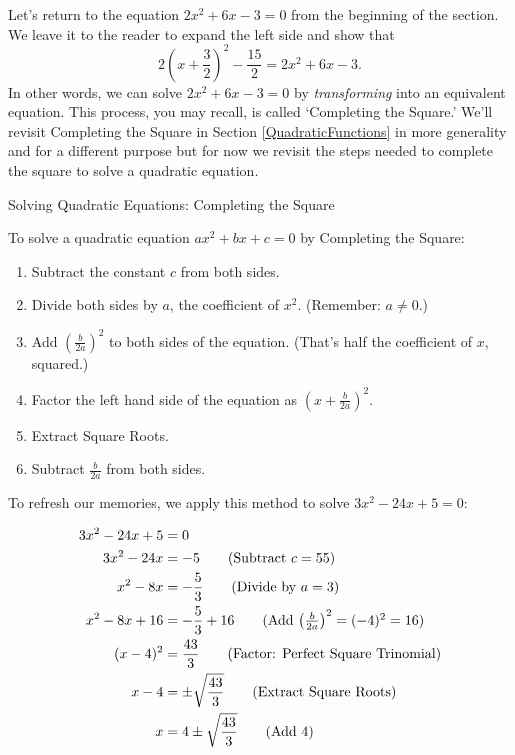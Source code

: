 Let's return to the equation $2x^2 + 6x - 3 = 0$ from the beginning of the section.  We leave it to the reader to expand the left side and show that \[2\left(x + \dfrac{3}{2}\right)^2 - \dfrac{15}{2} =  2x^2 + 6x - 3. \] In other words, we can solve $2x^2 + 6x - 3 = 0$  by \textit{transforming} into an equivalent equation. This process, you may recall, is called `Completing the Square.'  We'll revisit Completing the Square in Section \ref{QuadraticFunctions} in more generality and for a different purpose but for now we revisit the steps needed to complete the square to solve a quadratic equation.

\begin{floatbox}{Solving Quadratic Equations:  Completing the Square}
\label{completesquareeqns}

To solve a quadratic equation $ax^2 + bx + c = 0$ by Completing the Square:

\begin{enumerate}

\item  Subtract the constant $c$ from both sides.
\item  Divide both sides by $a$,  the coefficient of $x^2$.  (Remember:  $a \neq 0$.)
\item  Add $\left(\frac{b}{2a}\right)^2$ to both sides of the equation. (That's half the coefficient of $x$, squared.)
\item  Factor the left hand side of the equation as $\left(x + \frac{b}{2a}\right)^2$.
\item  Extract Square Roots.
\item  Subtract $\frac{b}{2a}$ from both sides.

\end{enumerate}

\end{floatbox}

To refresh our memories, we apply this method to solve $3x^2 - 24x + 5 = 0$:

\begin{align*}
3x^2 - 24x + 5 & = 0 \\
3x^2 - 24x  & = -5 \tag{Subtract  $c = 55$} \\
x^2 - 8x & = -\dfrac{5}{3} \tag{Divide by $a = 3$} \\
x^2 - 8x + 16 & = -\dfrac{5}{3} + 16 \tag{Add $\left(\frac{b}{2a}\right)^2 = (-4)^2 = 16$} \\
(x - 4)^2 & = \dfrac{43}{3} \tag{Factor: Perfect Square Trinomial} \\
x - 4 & = \pm \sqrt{\dfrac{43}{3}} \tag{Extract Square Roots} \\
x & = 4 \pm \sqrt{\dfrac{43}{3}} \tag{Add $4$} \\
\end{align*}


